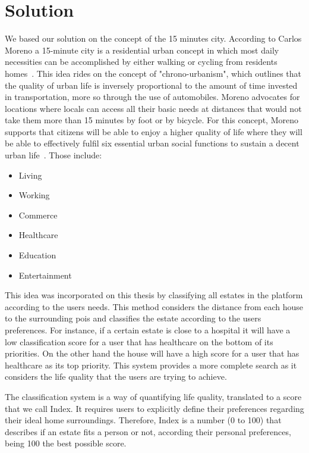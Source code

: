 \section{Solution}
\label{s:proposed_solution}

We based our solution on the concept of the 15 minutes city. According to Carlos Moreno a 15-minute city is a residential urban concept in which most daily necessities can be accomplished by either walking or cycling from residents homes~\cite{15mincity}. This idea rides on the concept of "chrono-urbanism", which outlines that the quality of urban life is inversely proportional to the amount of time invested in transportation, more so through the use of automobiles. Moreno advocates for locations where locals can access all their basic needs at distances that would not take them more than 15 minutes by foot or by bicycle. For this concept, Moreno supports that citizens will be able to enjoy a higher quality of life where they will be able to effectively fulfil six essential urban social functions to sustain a decent urban life~\cite{smartcities4010006}. Those include:

\begin{itemize}
    \item Living
    \item Working
    \item Commerce
    \item Healthcare
    \item Education
    \item Entertainment
\end{itemize}

This idea was incorporated on this thesis by classifying all estates in the platform according to the users needs. This method considers the distance from each house to the surrounding \acrshort{poi}s and classifies the estate according to the users preferences. For instance, if a certain estate is close to a hospital it will have a low classification score for a user that has healthcare on the bottom of its priorities. On the other hand the house will have a high score for a user that has healthcare as its top priority. This system provides a more complete search as it considers the life quality that the users are trying to achieve. 

The classification system is a way of quantifying life quality, translated to a score that we call Index. It requires users to explicitly define their preferences regarding their ideal home surroundings. Therefore, Index is a number (0 to 100) that describes 
if an estate fits a person or not, according their personal preferences, being 100 the best possible score. \\

